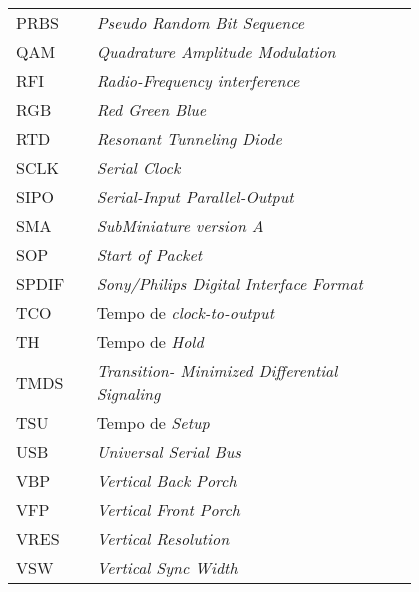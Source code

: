 \begin{flushleft}
\begin{longtable}{l p{0.8\linewidth}}
PRBS      & \textit{Pseudo Random Bit Sequence}                                                                   \\
QAM       & \textit{Quadrature Amplitude Modulation}                                                              \\
RFI       & \textit{Radio-Frequency interference }                                                                \\
RGB       & \textit{Red Green Blue }                                                                              \\
RTD       & \textit{Resonant Tunneling Diode }                                                                    \\
SCLK      & \textit{Serial Clock }                                                                                \\
SIPO      & \textit{Serial-Input Parallel-Output    }                                                             \\
SMA       &\textit{SubMiniature version A }                                                                      \\
SOP       & \textit{Start of Packet}                                                                              \\
SPDIF     & \textit{Sony/Philips Digital Interface Format }                                                       \\
TCO       & Tempo de \textit{clock-to-output }                                                                    \\
TH        & Tempo de \textit{Hold }                                                                               \\
TMDS      & \textit{Transition- Minimized Differential Signaling}                                                 \\
TSU       & Tempo de \textit{Setup}                                                                               \\
USB       & \textit{Universal Serial Bus}                                                                         \\
VBP       & \textit{Vertical Back Porch}                                                                          \\
VFP       & \textit{Vertical Front Porch}                                                                         \\
VRES      & \textit{Vertical Resolution }                                                                         \\
VSW       & \textit{Vertical Sync Width}                                                                         
\end{longtable}
\end{flushleft}

